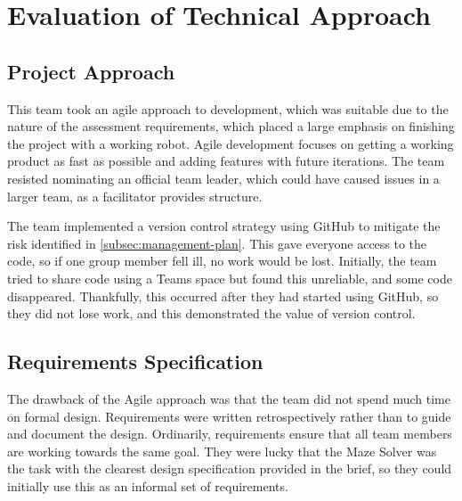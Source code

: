 


\section{Evaluation of Technical Approach}\label{sec:technical}
    \subsection{Project Approach}\label{subsec:technical-project_approach}
        This team took an agile approach to development, which was suitable due to the nature of the assessment requirements, which placed a large emphasis on finishing the project with a working robot.
        Agile development focuses on getting a working product as fast as possible and adding features with future iterations.
        The team resisted nominating an official team leader, which could have caused issues in a larger team, as a facilitator provides structure.

        The team implemented a version control strategy using GitHub to mitigate the risk identified in \autoref{subsec:management-plan}.
        This gave everyone access to the code, so if one group member fell ill, no work would be lost.
        Initially, the team tried to share code using a Teams space but found this unreliable, and some code disappeared.
        Thankfully, this occurred after they had started using GitHub, so they did not lose work, and this demonstrated the value of version control.

    \subsection{Requirements Specification}\label{subsec:technical-requirements}
        The drawback of the Agile approach was that the team did not spend much time on formal design.
        Requirements were written retrospectively rather than to guide and document the design.
        Ordinarily, requirements ensure that all team members are working towards the same goal.
        They were lucky that the Maze Solver was the task with the clearest design specification provided in the brief, so they could initially use this as an informal set of requirements.

